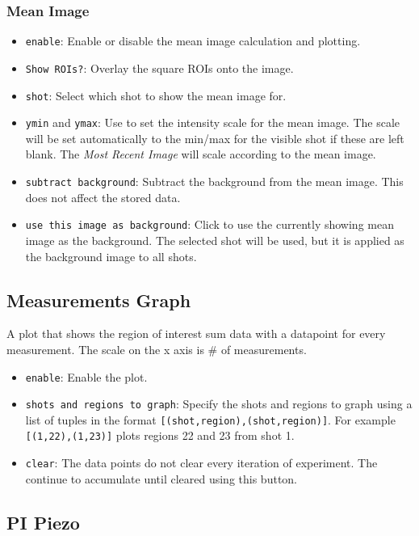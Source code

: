 \documentclass[pdftex,11pt,letterpaper]{article}
\begin{document}
\subsubsection{Mean Image}
\begin{itemize}
\item \texttt{enable}: Enable or disable the mean image calculation and plotting.
\item \texttt{Show ROIs?}:  Overlay the square ROIs onto the image.
\item \texttt{shot}:  Select which shot to show the mean image for.
\item \texttt{ymin} and \texttt{ymax}:  Use to set the intensity scale for the mean image.  The scale will be set automatically to the min/max for the visible shot if these are left blank.  The \textit{Most Recent Image} will scale according to the mean image.
\item \texttt{subtract background}:  Subtract the background from the mean image.  This does not affect the stored data.
\item \texttt{use this image as background}:  Click to use the currently showing mean image as the background.  The selected shot will be used, but it is applied as the background image to all shots.
\end{itemize}


\subsection{Measurements Graph}

A plot that shows the region of interest sum data with a datapoint for every measurement.  The scale on the x axis is \# of measurements.

\begin{itemize}
\item \texttt{enable}:  Enable the plot.
\item \texttt{shots and regions to graph}:  Specify the shots and regions to graph using a list of tuples in the format \texttt{[(shot,region),(shot,region)]}.  For example \texttt{[(1,22),(1,23)]} plots regions 22 and 23 from shot 1.
\item \texttt{clear}:  The data points do not clear every iteration of experiment.  The continue to accumulate until cleared using this button.
\end{itemize}

\subsection{PI Piezo}
\end{document}
